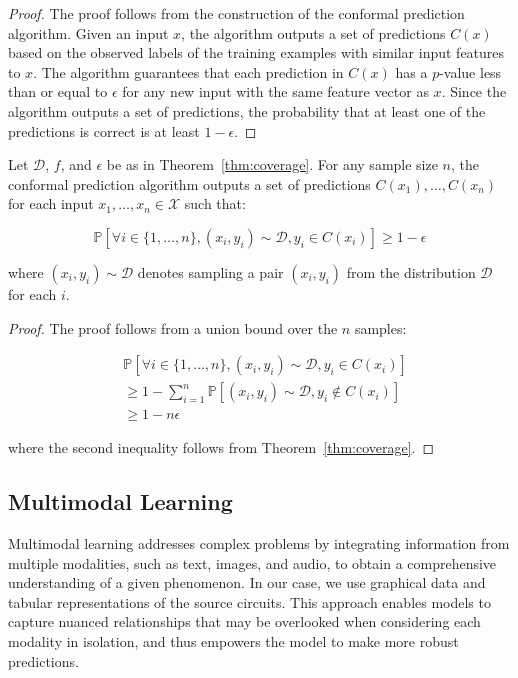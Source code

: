 \begin{proof}
The proof follows from the construction of the conformal prediction algorithm. Given an input $x$, the algorithm outputs a set of predictions $C(x)$ based on the observed labels of the training examples with similar input features to $x$. The algorithm guarantees that each prediction in $C(x)$ has a $p$-value less than or equal to $\epsilon$ for any new input with the same feature vector as $x$. Since the algorithm outputs a set of predictions, the probability that at least one of the predictions is correct is at least $1-\epsilon$. 
\end{proof}

\begin{corollary}\label{cor:coverage}
Let $\mathcal{D}$, $f$, and $\epsilon$ be as in Theorem~\ref{thm:coverage}. For any sample size $n$, the conformal prediction algorithm outputs a set of predictions $C(x_1),\ldots,C(x_n)$ for each input $x_1,\ldots,x_n \in \mathcal{X}$ such that:

\begin{equation*}
\mathbb{P}[\forall i \in \{1,\ldots,n\}, (x_i,y_i) \sim \mathcal{D}, y_i \in C(x_i)] \geq 1-\epsilon
\end{equation*}

where $(x_i,y_i) \sim \mathcal{D}$ denotes sampling a pair $(x_i,y_i)$ from the distribution $\mathcal{D}$ for each $i$.

\end{corollary}

\begin{proof}
The proof follows from a union bound over the $n$ samples:

\begin{equation*}
\begin{aligned}
&\mathbb{P}[\forall i \in \{1,\ldots,n\}, (x_i,y_i) \sim \mathcal{D}, y_i \in C(x_i)] \\
&\geq 1 - \sum_{i=1}^n \mathbb{P}[(x_i, y_i) \sim \mathcal{D}, y_i \notin C(x_i)] \\
&\geq 1 - n \epsilon
\end{aligned}
\end{equation*}

where the second inequality follows from Theorem~\ref{thm:coverage}. 
\end{proof}


\subsection*{Multimodal Learning}
\label{sec:multimodal}
Multimodal learning \cite{ngiam2011multimodal} addresses complex problems by integrating information from multiple modalities, such as text, images, and audio, to obtain a comprehensive understanding of a given phenomenon. In our case, we use graphical data and tabular representations of the source circuits. This approach enables models to capture nuanced relationships that may be overlooked when considering each modality in isolation, and thus empowers the model to make more robust predictions.


